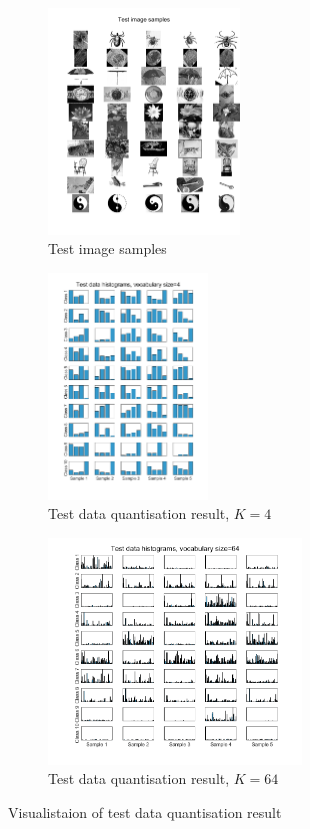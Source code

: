 \begin{figure}[htbp]
	\centering
	\begin{subfigure}[t]{0.3\linewidth}
		\centering
		\includegraphics[height=6cm]{image/q1-appendix/test_img.png} 
		\caption{Test image samples}
	\end{subfigure}%
	\hfill
	\begin{subfigure}[t]{0.3\linewidth}
		\centering
		\includegraphics[height=6cm]{image/q1-appendix/test_4.png}
		\caption{Test data quantisation result, $K=4$}
	\end{subfigure}
	\hfill
	\begin{subfigure}[t]{0.3\linewidth}
		\centering
		\includegraphics[height=6cm]{image/q1-appendix/test_64.png}
		\caption{Test data quantisation result, $K=64$}
	\end{subfigure}
	\caption{Visualistaion of test data quantisation result}
	\label{fig:q1_histogram_te}
\end{figure}

